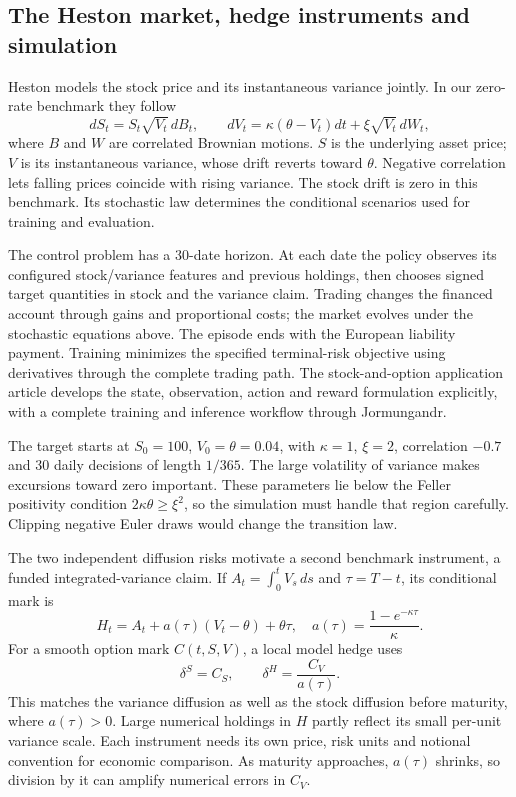 \documentclass[8pt]{strategynet-journal}
\begin{document}
\begin{SNcolumns}
\section{The Heston market, hedge instruments and simulation}
Heston models the stock price and its instantaneous variance jointly. In our
zero-rate benchmark they follow
\[
 dS_t=S_t\sqrt{V_t}\,dB_t,\qquad
 dV_t=\kappa(\theta-V_t)dt+\xi\sqrt{V_t}\,dW_t,
\]
where $B$ and $W$ are correlated Brownian motions. $S$ is the underlying asset
price; $V$ is its
instantaneous variance, whose drift reverts toward $\theta$.
Negative correlation lets falling prices coincide with rising variance.
The stock drift is zero in this benchmark. Its stochastic law determines the
conditional scenarios used for training and evaluation.

The control problem has a 30-date horizon. At each date the policy observes
its configured stock/variance features and previous holdings, then chooses
signed target quantities in stock and the variance claim. Trading changes
the financed account through gains and proportional costs; the market evolves
under the stochastic equations above. The episode ends with the European
liability payment. Training minimizes the specified terminal-risk objective
using derivatives through the complete trading path. The stock-and-option application article develops the state, observation,
action and reward formulation explicitly, with a complete training and
inference workflow through Jormungandr.

The target starts at $S_0=100$, $V_0=\theta=0.04$, with $\kappa=1$,
$\xi=2$, correlation $-0.7$ and 30 daily decisions of length $1/365$.
The large volatility of variance makes excursions toward zero important.
These parameters lie below the Feller positivity condition
$2\kappa\theta\geq\xi^2$, so the simulation must handle that region carefully.
Clipping negative Euler draws would change the transition law.

The two independent diffusion risks motivate a second benchmark instrument,
a funded integrated-variance claim. If
$A_t=\int_0^tV_s\,ds$ and $\tau=T-t$, its conditional mark is
\[
 H_t=A_t+a(\tau)(V_t-\theta)+\theta\tau,
 \quad a(\tau)=\frac{1-e^{-\kappa\tau}}{\kappa}.
\]
For a smooth option mark $C(t,S,V)$, a local model hedge uses
\[
 \delta^S=C_S,\qquad \delta^H=\frac{C_V}{a(\tau)}.
\]
This matches the variance diffusion as well as the stock diffusion before
maturity, where $a(\tau)>0$. Large numerical holdings in $H$ partly reflect
its small per-unit variance scale. Each instrument needs its own price, risk
units and notional convention for economic comparison. As maturity approaches,
$a(\tau)$ shrinks, so division by it can amplify numerical errors in $C_V$.


\end{SNcolumns}
\end{document}
